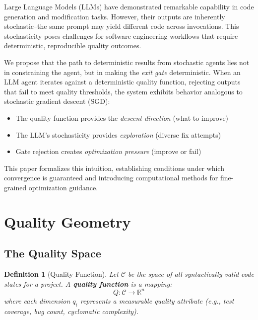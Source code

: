 \documentclass[11pt,a4paper]{article}
\newtheorem{definition}[theorem]{Definition}
\begin{document}
Large Language Models (LLMs) have demonstrated remarkable capability in code generation and modification tasks. However, their outputs are inherently stochastic--the same prompt may yield different code across invocations. This stochasticity poses challenges for software engineering workflows that require deterministic, reproducible quality outcomes.

We propose that the path to deterministic results from stochastic agents lies not in constraining the agent, but in making the \emph{exit gate} deterministic. When an LLM agent iterates against a deterministic quality function, rejecting outputs that fail to meet quality thresholds, the system exhibits behavior analogous to stochastic gradient descent (SGD):

\begin{itemize}
  \item The quality function provides the \emph{descent direction} (what to improve)
  \item The LLM's stochasticity provides \emph{exploration} (diverse fix attempts)
  \item Gate rejection creates \emph{optimization pressure} (improve or fail)
\end{itemize}

This paper formalizes this intuition, establishing conditions under which convergence is guaranteed and introducing computational methods for fine-grained optimization guidance.

\section{Quality Geometry}
\label{sec:geometry}

\subsection{The Quality Space}

\begin{definition}[Quality Function]
Let $\mathcal{C}$ be the space of all syntactically valid code states for a project. A \textbf{quality function} is a mapping:
\[
Q: \mathcal{C} \to \mathbb{R}^n
\]
where each dimension $q_i$ represents a measurable quality attribute (e.g., test coverage, bug count, cyclomatic complexity).
\end{definition}
\end{document}
